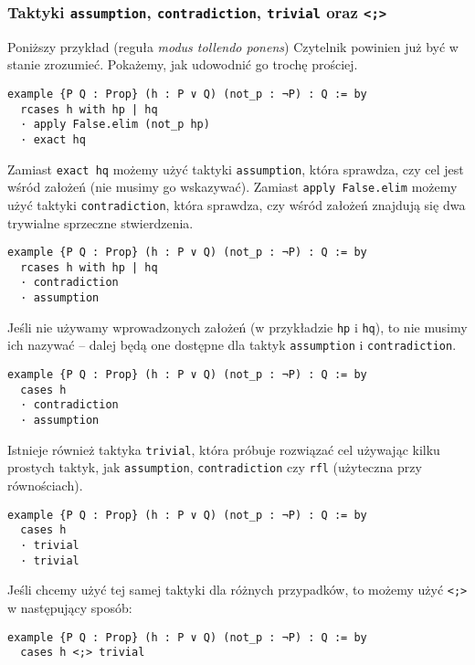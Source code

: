 \documentclass[polish,pretty]{angav}
\newcommand{\Lean}[1]{\texttt{#1}}
\begin{document}
\subsubsection*{Taktyki \texttt{assumption}, \texttt{contradiction}, \texttt{trivial} oraz \texttt{<;>}}

Poniższy przykład (reguła \textit{modus tollendo ponens}) Czytelnik powinien już być w stanie zrozumieć. Pokażemy, jak udowodnić go trochę prościej.
\begin{verbatim}
example {P Q : Prop} (h : P ∨ Q) (not_p : ¬P) : Q := by
  rcases h with hp | hq
  · apply False.elim (not_p hp)
  · exact hq
\end{verbatim}

Zamiast \Lean{exact hq} możemy użyć taktyki \Lean{assumption}, która sprawdza, czy cel jest wśród założeń (nie musimy go wskazywać). Zamiast \Lean{apply False.elim} możemy użyć taktyki \Lean{contradiction}, która sprawdza, czy wśród założeń znajdują się dwa trywialne sprzeczne stwierdzenia.
\begin{verbatim}
example {P Q : Prop} (h : P ∨ Q) (not_p : ¬P) : Q := by
  rcases h with hp | hq
  · contradiction
  · assumption
\end{verbatim}

Jeśli nie używamy wprowadzonych założeń (w przykładzie \Lean{hp} i \Lean{hq}), to nie musimy ich nazywać -- dalej będą one dostępne dla taktyk \Lean{assumption} i \Lean{contradiction}.
\begin{verbatim}
example {P Q : Prop} (h : P ∨ Q) (not_p : ¬P) : Q := by
  cases h
  · contradiction
  · assumption
\end{verbatim}

Istnieje również taktyka \Lean{trivial}, która próbuje rozwiązać cel używając kilku prostych taktyk, jak \Lean{assumption}, \Lean{contradiction} czy \Lean{rfl} (użyteczna przy równościach).
\begin{verbatim}
example {P Q : Prop} (h : P ∨ Q) (not_p : ¬P) : Q := by
  cases h
  · trivial
  · trivial
\end{verbatim}

Jeśli chcemy użyć tej samej taktyki dla różnych przypadków, to możemy użyć \Lean{<;>} w następujący sposób:
\begin{verbatim}
example {P Q : Prop} (h : P ∨ Q) (not_p : ¬P) : Q := by
  cases h <;> trivial
\end{verbatim}
\end{document}
